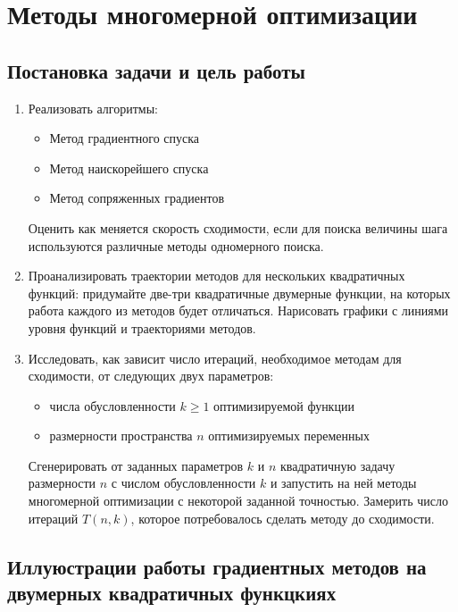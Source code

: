 \chapter{Методы многомерной оптимизации}


\section{Постановка задачи и цель работы}

\begin{enumerate}
    \item Реализовать алгоритмы:
    \begin{itemize}
        \item 	Метод градиентного спуска
        \item   Метод наискорейшего спуска
        \item   Метод сопряженных градиентов
    \end{itemize}
    Оценить как меняется скорость сходимости, если для поиска величины шага используются
    различные методы одномерного поиска.
    \item Проанализировать траектории методов для нескольких квадратичных
    функций: придумайте две-три квадратичные двумерные функции, на которых
    работа каждого из методов будет отличаться. Нарисовать графики с линиями
    уровня функций и траекториями методов.
    \item Исследовать, как зависит число итераций, необходимое методам для
    сходимости, от следующих двух параметров:
    \begin{itemize}
        \item числа обусловленности $k \geq 1$ оптимизируемой функции
        \item размерности пространства $n$ оптимизируемых переменных
    \end{itemize}
    Сгенерировать от заданных параметров $k$ и $n$ квадратичную задачу размерности $n$ с числом обусловленности
    $k$ и запустить на ней методы многомерной оптимизации с некоторой заданной точностью. Замерить число итераций $T(n, k)$, которое 
    потребовалось сделать методу до сходимости.
\end{enumerate}



\section{Иллуюстрации работы градиентных методов на двумерных квадратичных функцкиях}

